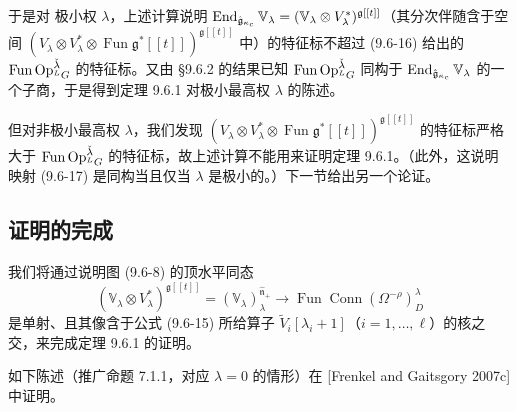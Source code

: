 于是对 极小权 $\lambda$，上述计算说明 $\operatorname{End}_{\hat{\mathfrak{g}}_{\kappa_c}}\mathbb{V}_\lambda=(\mathbb{V}_\lambda\otimes V_\lambda^*)^{\mathfrak{g}[[t]]}$（其分次伴随含于空间 $\left(V_\lambda\otimes V_\lambda^*\otimes\operatorname{Fun}\mathfrak{g}^*[[t]]\right)^{\mathfrak{g}[[t]]}$ 中）的特征标不超过 (9.6-16) 给出的 $\operatorname{Fun}\operatorname{Op}^{\check\lambda}_{{}^LG}$ 的特征标。又由 §9.6.2 的结果已知 $\operatorname{Fun}\operatorname{Op}^{\check\lambda}_{{}^LG}$ 同构于 $\operatorname{End}_{\hat{\mathfrak{g}}_{\kappa_c}}\mathbb{V}_\lambda$ 的一个子商，于是得到定理 9.6.1 对极小最高权 $\lambda$ 的陈述。

但对非极小最高权 $\lambda$，我们发现 $\left(V_\lambda\otimes V_\lambda^*\otimes\operatorname{Fun}\mathfrak{g}^*[[t]]\right)^{\mathfrak{g}[[t]]}$ 的特征标严格大于 $\operatorname{Fun}\operatorname{Op}^{\check\lambda}_{{}^LG}$ 的特征标，故上述计算不能用来证明定理 9.6.1。（此外，这说明映射 (9.6-17) 是同构当且仅当 $\lambda$ 是极小的。）下一节给出另一个论证。

\subsection{证明的完成}

我们将通过说明图 (9.6-8) 的顶水平同态
\begin{equation}
    (\mathbb{V}_\lambda\otimes V_\lambda^*)^{\mathfrak{g}[[t]]}
    =(\mathbb{V}_\lambda)^{\hat{\mathfrak{n}}_+}_\lambda
    \to\operatorname{Fun}\operatorname{Conn}(\Omega^{-\rho})^\lambda_D
    \tag{9.6-23}
\end{equation}
是单射、且其像含于公式 (9.6-15) 所给算子 $\widetilde{V}_i[\lambda_i+1]$（$i=1,\dots,\ell$）的核之交，来完成定理 9.6.1 的证明。

如下陈述（推广命题 7.1.1，对应 $\lambda=0$ 的情形）在 [Frenkel and Gaitsgory 2007c] 中证明。

